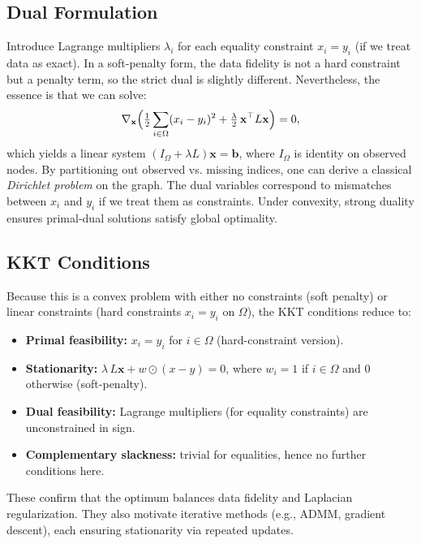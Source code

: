\documentclass[12pt]{article}                                %
\begin{document}
\subsection{Dual Formulation}   %
Introduce Lagrange multipliers $\lambda_i$ for each equality constraint $x_i = y_i$ (if we treat 
data as exact). In a soft-penalty form, the data fidelity is not a hard constraint but a penalty 
term, so the strict dual is slightly different. Nevertheless, the essence is that we can solve:
\begin{equation}
\nabla_{\mathbf{x}} \Bigl(\tfrac12\sum_{i\in \Omega}(x_i-y_i)^2 + 
\tfrac{\lambda}{2}\,\mathbf{x}^\top L \mathbf{x}\Bigr) = 0,
\end{equation}
which yields a linear system $(I_\Omega + \lambda L)\mathbf{x} = \mathbf{b}$, where $I_\Omega$ 
is identity on observed nodes. By partitioning out observed vs. missing indices, one can derive 
a classical \emph{Dirichlet problem} on the graph. The dual variables correspond to mismatches 
between $x_i$ and $y_i$ if we treat them as constraints. Under convexity, strong duality ensures 
primal-dual solutions satisfy global optimality.

\subsection{KKT Conditions}  %
Because this is a convex problem with either no constraints (soft penalty) or linear constraints 
(hard constraints $x_i = y_i$ on $\Omega$), the KKT conditions reduce to:
\begin{itemize}
    \item \textbf{Primal feasibility:} $x_i = y_i$ for $i\in\Omega$ (hard-constraint version).
    \item \textbf{Stationarity:} $\lambda\,L\mathbf{x} + w \odot (x - y) = 0$, 
          where $w_i = 1$ if $i\in\Omega$ and $0$ otherwise (soft-penalty).
    \item \textbf{Dual feasibility:} Lagrange multipliers (for equality constraints) are unconstrained in sign.
    \item \textbf{Complementary slackness:} trivial for equalities, hence no further conditions here.
\end{itemize}
These confirm that the optimum balances data fidelity and Laplacian regularization. They also 
motivate iterative methods (e.g., ADMM, gradient descent), each ensuring stationarity via 
repeated updates.

\end{document}
